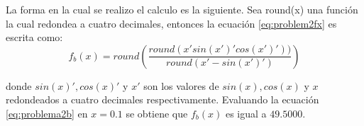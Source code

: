 La forma en la cual se realizo el calculo es la siguiente. Sea round(x) una función la cual redondea a cuatro decimales, entonces la ecuación \ref{eq:problem2fx} es escrita como:
\begin{equation}
    f_b(x) = round\left(\frac{round(x'sin(x')'cos(x')'))}{round(x'-sin(x')')}\right)
    \label{eq:problema2b}
\end{equation}

donde $sin(x)', cos(x)'$ y $x'$ son los valores de $sin(x),cos(x)$ y $x$ redondeados a cuatro decimales respectivamente. Evaluando la ecuación \ref{eq:problema2b} en $x=0.1$ se obtiene que $f_b(x)$ es igual a $49.5000$.

